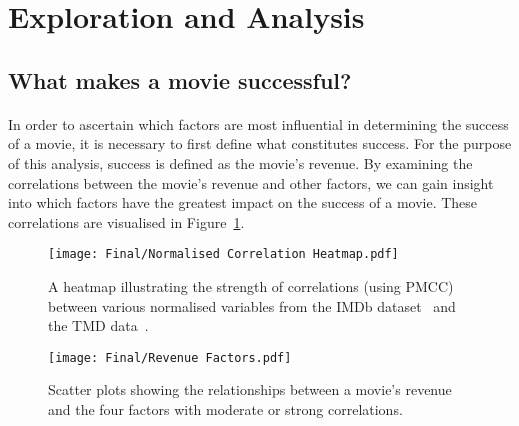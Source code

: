 \newpage
\section{Exploration and Analysis}
    \subsection{What makes a movie successful?}
        \begin{multicols}{2}
            \paragraph{}
                In order to ascertain which factors are most influential in determining the
                    success of a movie, it is necessary to first define what constitutes success.
                For the purpose of this analysis, success is defined as the movie's revenue.
                By examining the correlations between the movie's revenue and other factors, we
                    can gain insight into which factors have the greatest impact on the success of
                    a movie.
                These correlations are visualised in Figure~\ref{fig-heatmap}.

                \begin{figure}[H]
                    \centering
                    \texttt{[image: Final/Normalised Correlation Heatmap.pdf]}
                    \caption{
                        A heatmap illustrating the strength of correlations (using PMCC) between various normalised
                        variables from the IMDb dataset~\cite{data:IMDb} and the TMD
                        data~\cite{data:TMD}.
                    }\label{fig-heatmap}
                \end{figure}

                \columnbreak

                \begin{figure}[H]
                    \centering
                    \texttt{[image: Final/Revenue Factors.pdf]}
                    \caption{
                        Scatter plots showing the relationships between a movie's revenue and the four
                        factors with moderate or strong correlations.
                    }\label{fig-revenue-factors}
                \end{figure}


\end{multicols}

